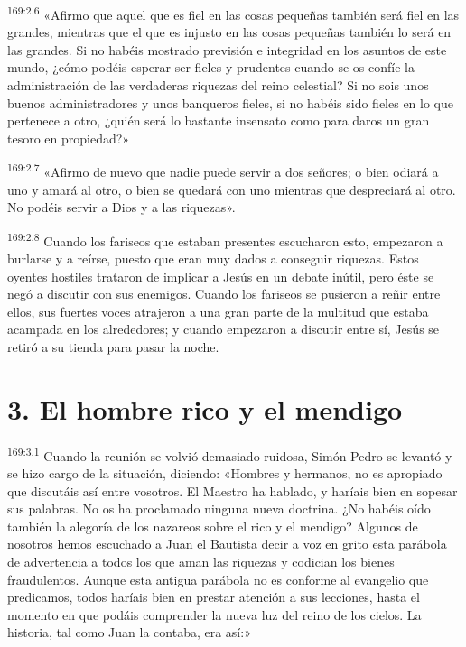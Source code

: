 \par 
\textsuperscript{169:2.6} «Afirmo que aquel que es fiel en las cosas pequeñas también será fiel en las grandes, mientras que el que es injusto en las cosas pequeñas también lo será en las grandes. Si no habéis mostrado previsión e integridad en los asuntos de este mundo, ¿cómo podéis esperar ser fieles y prudentes cuando se os confíe la administración de las verdaderas riquezas del reino celestial? Si no sois unos buenos administradores y unos banqueros fieles, si no habéis sido fieles en lo que pertenece a otro, ¿quién será lo bastante insensato como para daros un gran tesoro en propiedad?»

\par 
\textsuperscript{169:2.7} «Afirmo de nuevo que nadie puede servir a dos señores; o bien odiará a uno y amará al otro, o bien se quedará con uno mientras que despreciará al otro. No podéis servir a Dios y a las riquezas».

\par 
\textsuperscript{169:2.8} Cuando los fariseos que estaban presentes escucharon esto, empezaron a burlarse y a reírse, puesto que eran muy dados a conseguir riquezas. Estos oyentes hostiles trataron de implicar a Jesús en un debate inútil, pero éste se negó a discutir con sus enemigos. Cuando los fariseos se pusieron a reñir entre ellos, sus fuertes voces atrajeron a una gran parte de la multitud que estaba acampada en los alrededores; y cuando empezaron a discutir entre sí, Jesús se retiró a su tienda para pasar la noche.

\section*{3. El hombre rico y el mendigo}
\par 
\textsuperscript{169:3.1} Cuando la reunión se volvió demasiado ruidosa, Simón Pedro se levantó y se hizo cargo de la situación, diciendo: «Hombres y hermanos, no es apropiado que discutáis así entre vosotros. El Maestro ha hablado, y haríais bien en sopesar sus palabras. No os ha proclamado ninguna nueva doctrina. ¿No habéis oído también la alegoría de los nazareos sobre el rico y el mendigo? Algunos de nosotros hemos escuchado a Juan el Bautista decir a voz en grito esta parábola de advertencia a todos los que aman las riquezas y codician los bienes fraudulentos. Aunque esta antigua parábola no es conforme al evangelio que predicamos, todos haríais bien en prestar atención a sus lecciones, hasta el momento en que podáis comprender la nueva luz del reino de los cielos. La historia, tal como Juan la contaba, era así:»

